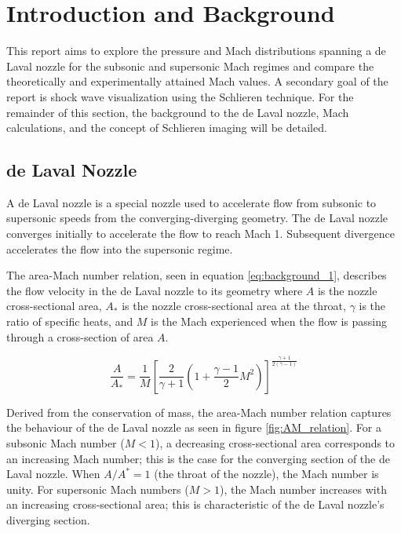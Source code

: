 \documentclass[runningheads]{llncs}
\begin{document}


\newpage
\section{Introduction and Background}\label{sec:introduction_and_background}

This report aims to explore the pressure and Mach distributions spanning a de Laval nozzle for the subsonic and supersonic Mach regimes and compare the theoretically and experimentally attained Mach values. A secondary goal of the report is shock wave visualization using the Schlieren technique. For the remainder of this section, the background to the de Laval nozzle, Mach calculations, and the concept of Schlieren imaging will be detailed.

\subsection{de Laval Nozzle}

A de Laval nozzle is a special nozzle used to accelerate flow from subsonic to supersonic speeds from the converging-diverging geometry. The de Laval nozzle converges initially to accelerate the flow to reach Mach 1. Subsequent divergence accelerates the flow into the supersonic regime.\newline

\noindent
The area-Mach number relation, seen in equation \ref{eq:background_1}, describes the flow velocity in the de Laval nozzle to its geometry where $A$ is the nozzle cross-sectional area, $A_*$ is the nozzle cross-sectional area at the throat, $\gamma$ is the ratio of specific heats, and $M$ is the Mach experienced when the flow is passing through a cross-section of area $A$.

\begin{equation}
    \frac{A}{A_*}=\frac{1}{M}\left[\frac{2}{\gamma + 1}\left(1 + \frac{\gamma - 1}{2}M^2\right)\right]^{\frac{\gamma + 1}{2(\gamma - 1)}}
    \label{eq:background_1}
\end{equation}

\noindent
Derived from the conservation of mass, the area-Mach number relation captures the behaviour of the de Laval nozzle as seen in figure \ref{fig:AM_relation}. For a subsonic Mach number ($M<1$), a decreasing cross-sectional area corresponds to an increasing Mach number; this is the case for the converging section of the de Laval nozzle. When $A/A^*=1$ (the throat of the nozzle), the Mach number is unity. For supersonic Mach numbers ($M>1$), the Mach number increases with an increasing cross-sectional area; this is characteristic of the de Laval nozzle's diverging section.
\end{document}
